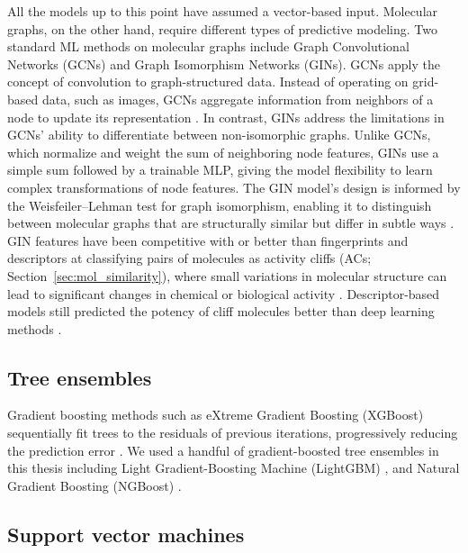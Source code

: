 All the models up to this point have assumed a vector-based input. Molecular graphs, on the other hand, require different types of predictive modeling. Two standard ML methods on molecular graphs include Graph Convolutional Networks (GCNs) and Graph Isomorphism Networks (GINs). GCNs apply the concept of convolution to graph-structured data. Instead of operating on grid-based data, such as images, GCNs aggregate information from neighbors of a node to update its representation \citep{Kipf2017}. In contrast, GINs address the limitations in GCNs’ ability to differentiate between non-isomorphic graphs. Unlike GCNs, which normalize and weight the sum of neighboring node features, GINs use a simple sum followed by a trainable MLP, giving the model flexibility to learn complex transformations of node features. The GIN model’s design is informed by the Weisfeiler--Lehman test for graph isomorphism, enabling it to distinguish between molecular graphs that are structurally similar but differ in subtle ways \citep{TeachOpenCADD2023, Xu2019}. GIN features have been competitive with or better than fingerprints and descriptors at classifying pairs of molecules as activity cliffs (ACs; Section~\ref{sec:mol_similarity}), where small variations in molecular structure can lead to significant changes in chemical or biological activity \citep{Dablander2023}. Descriptor-based models still predicted the potency of cliff molecules better than deep learning methods \citep{vanTilborg2022}. 


\subsection{Tree ensembles}

Gradient boosting methods such as eXtreme Gradient Boosting (XGBoost) sequentially fit trees to the residuals of previous iterations, progressively reducing the prediction error \citep{Chen2016, Mustapha2016, Tian2022}. We used a handful of gradient-boosted tree ensembles in this thesis including Light Gradient-Boosting Machine (LightGBM) \citep{ke2017lightgbm}, and Natural Gradient Boosting (NGBoost) \citep{Duan2020}.

\subsection{Support vector machines}


